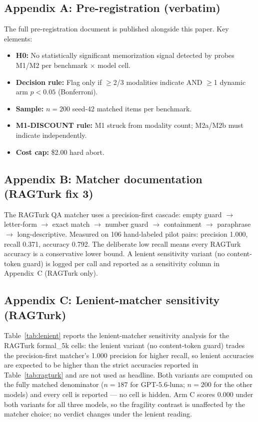 \documentclass[11pt]{article}
\begin{document}
\subsection*{Appendix A: Pre-registration (verbatim)}

The full pre-registration document is published alongside this paper. Key elements:
\begin{itemize}
\item \textbf{H0:} No statistically significant memorization signal detected by probes M1/M2 per benchmark $\times$ model cell.
\item \textbf{Decision rule:} Flag only if $\geq$2/3 modalities indicate AND $\geq$1 dynamic arm $p < 0.05$ (Bonferroni).
\item \textbf{Sample:} $n=200$ seed-42 matched items per benchmark.
\item \textbf{M1-DISCOUNT rule:} M1 struck from modality count; M2a/M2b must indicate independently.
\item \textbf{Cost cap:} \$2.00 hard abort.
\end{itemize}

\subsection*{Appendix B: Matcher documentation (RAGTurk fix 3)}

The RAGTurk QA matcher uses a precision-first cascade: empty guard $\rightarrow$ letter-form $\rightarrow$ exact match $\rightarrow$ number guard $\rightarrow$ containment $\rightarrow$ paraphrase $\rightarrow$ long-descriptive. Measured on 106 hand-labeled pilot pairs: precision 1.000, recall 0.371, accuracy 0.792. The deliberate low recall means every RAGTurk accuracy is a conservative lower bound. A lenient sensitivity variant (no content-token guard) is logged per call and reported as a sensitivity column in Appendix~C (RAGTurk only).

\subsection*{Appendix C: Lenient-matcher sensitivity (RAGTurk)}

Table~\ref{tab:lenient} reports the lenient-matcher sensitivity analysis for the RAGTurk formal\_5k cells: the lenient variant (no content-token guard) trades the precision-first matcher's 1.000 precision for higher recall, so lenient accuracies are expected to be higher than the strict accuracies reported in Table~\ref{tab:ragturk} and are not used as headline. Both variants are computed on the fully matched denominator ($n{=}187$ for GPT-5.6-luna; $n{=}200$ for the other models) and every cell is reported --- no cell is hidden. Arm C scores 0.000 under both variants for all three models, so the fragility contrast is unaffected by the matcher choice; no verdict changes under the lenient reading.
\end{document}
